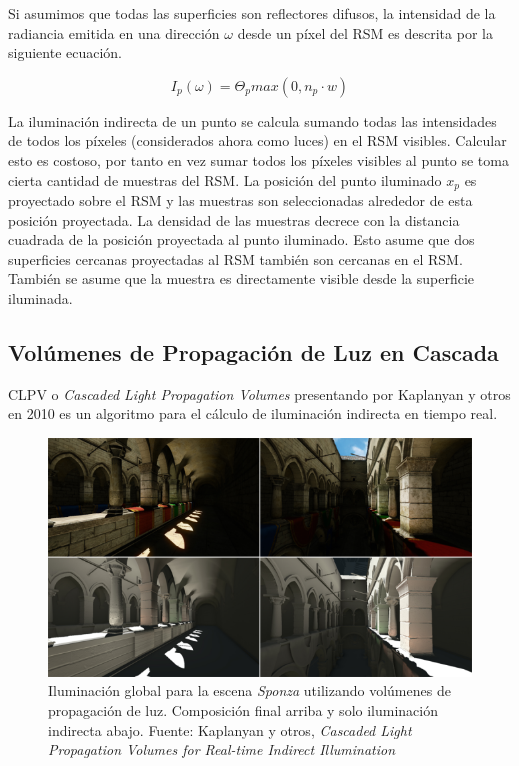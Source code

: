 Si asumimos que todas las superficies son reflectores difusos, la intensidad de la radiancia emitida en una dirección $\omega$ desde un píxel del \ac{RSM} es descrita por la siguiente ecuación.

\begin{equation}
    I_{p}(\omega) = \Theta_{p}max(0, n_{p} \cdot {w})
    \label{eq:rsm_radiance}
\end{equation}

La iluminación indirecta de un punto se calcula sumando todas las intensidades de todos los píxeles (considerados ahora como luces) en el \ac{RSM} visibles. Calcular esto es costoso, por tanto en vez sumar todos los píxeles visibles al punto se toma cierta cantidad de muestras del \ac{RSM}. La posición del punto iluminado $x_{p}$ es proyectado sobre el \ac{RSM} y las muestras son seleccionadas alrededor de esta posición proyectada. La densidad de las muestras decrece con la distancia cuadrada de la posición proyectada al punto iluminado. Esto asume que dos superficies cercanas proyectadas al \ac{RSM} también son cercanas en el \ac{RSM}. También se asume que la muestra es directamente visible desde la superficie iluminada.

\subsection{Volúmenes de Propagación de Luz en Cascada}
\label{sub:clpv}
\Ac{CLPV} o \emph{Cascaded Light Propagation Volumes} presentando por Kaplanyan y otros en 2010 \cite{Kaplanyan:2010} es un algoritmo para el cálculo de iluminación indirecta en tiempo real.

\begin{figure}[H]
	\centering
	\includegraphics[width=0.85\linewidth]{media/lpvresult.png}
	\caption{Iluminación global para la escena \emph{Sponza} utilizando volúmenes de propagación de luz. Composición final arriba y solo iluminación indirecta abajo. Fuente: Kaplanyan y otros, \emph{Cascaded Light Propagation Volumes for Real-time Indirect Illumination} \cite{Kaplanyan:2010}}
	\label{fig:lvp_results}
\end{figure}

